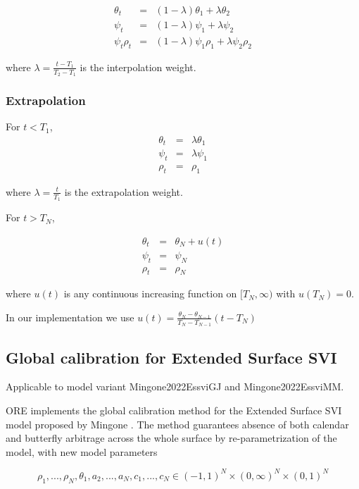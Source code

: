 \documentclass{amsart}
\theoremstyle{plain}
\numberwithin{equation}{section}
\begin{document}
\begin{eqnarray}
\theta_t &=& (1 - \lambda) \theta_1 + \lambda \theta_2 \\
\psi_t &=& (1 - \lambda) \psi_1 + \lambda \psi_2 \\
\psi_t \rho_t &=& (1 - \lambda) \psi_1 \rho_1 + \lambda \psi_2 \rho_2
\end{eqnarray}

where $\lambda = \frac{t - T_1}{T_2 - T_1}$ is the interpolation weight.

\subsubsection{Extrapolation}

For $t < T_1$,
\begin{eqnarray}
\theta_t &=& \lambda \theta_1 \\
\psi_t &=& \lambda \psi_1 \\
\rho_t &=& \rho_1
\end{eqnarray}

where $\lambda = \frac{t}{T_1}$ is the extrapolation weight.

For $t > T_N$,

\begin{eqnarray}
\theta_t &=& \theta_N + u(t) \\
\psi_t &=& \psi_N \\
\rho_t &=& \rho_N
\end{eqnarray}

where $u(t)$ is any continuous increasing function on $[T_N, \infty)$ with $u(T_N) = 0$.

In our implementation we use $u(t) = \frac{\theta_N - \theta_{N-1}}{T_N - T_{N-1}} (t - T_N)$


\subsection{Global calibration for Extended Surface SVI}

Applicable to model variant Mingone2022EssviGJ and Mingone2022EssviMM.

ORE implements the global calibration method for the Extended Surface SVI model proposed by Mingone \cite{Mingone_2022}.
The method guarantees absence of both calendar and butterfly arbitrage across the whole surface by re-parametrization of the model,
with new model parameters

\begin{equation}
\rho_1, ..., \rho_N, \theta_1, a_2, ..., a_N, c_1, ..., c_N \in (-1, 1)^N \times (0, \infty)^N \times (0, 1)^N
\end{equation}
\end{document}

